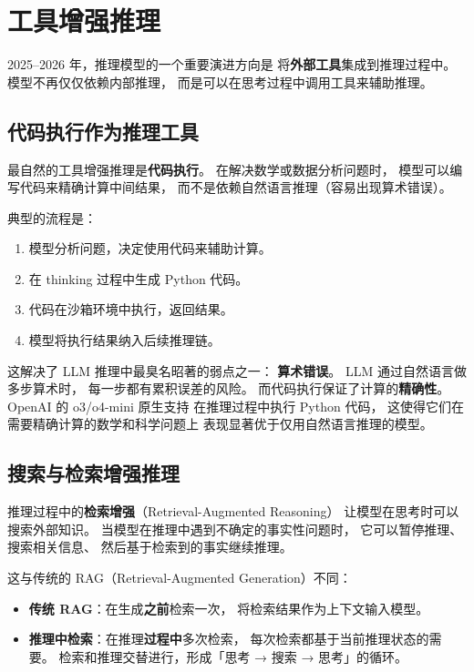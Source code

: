 \section{工具增强推理}

2025--2026 年，推理模型的一个重要演进方向是
将\textbf{外部工具}集成到推理过程中。
模型不再仅仅依赖内部推理，
而是可以在思考过程中调用工具来辅助推理。

\subsection{代码执行作为推理工具}

最自然的工具增强推理是\textbf{代码执行}。
在解决数学或数据分析问题时，
模型可以编写代码来精确计算中间结果，
而不是依赖自然语言推理（容易出现算术错误）。

典型的流程是：
\begin{enumerate}[noitemsep]
  \item 模型分析问题，决定使用代码来辅助计算。
  \item 在 thinking 过程中生成 Python 代码。
  \item 代码在沙箱环境中执行，返回结果。
  \item 模型将执行结果纳入后续推理链。
\end{enumerate}

这解决了 LLM 推理中最臭名昭著的弱点之一：
\textbf{算术错误}。
LLM 通过自然语言做多步算术时，
每一步都有累积误差的风险。
而代码执行保证了计算的\textbf{精确性}。
OpenAI 的 o3/o4-mini 原生支持
在推理过程中执行 Python 代码，
这使得它们在需要精确计算的数学和科学问题上
表现显著优于仅用自然语言推理的模型。

\subsection{搜索与检索增强推理}

推理过程中的\textbf{检索增强}（Retrieval-Augmented Reasoning）
让模型在思考时可以搜索外部知识。
当模型在推理中遇到不确定的事实性问题时，
它可以暂停推理、搜索相关信息、
然后基于检索到的事实继续推理。

这与传统的 RAG（Retrieval-Augmented Generation）不同：
\begin{itemize}[noitemsep]
  \item \textbf{传统 RAG}：在生成\textbf{之前}检索一次，
        将检索结果作为上下文输入模型。
  \item \textbf{推理中检索}：在推理\textbf{过程中}多次检索，
        每次检索都基于当前推理状态的需要。
        检索和推理交替进行，形成「思考 → 搜索 → 思考」的循环。
\end{itemize}

